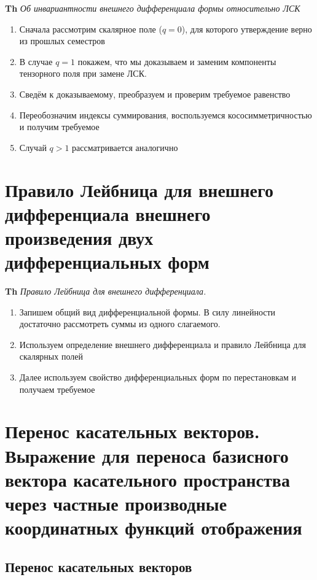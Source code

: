 \documentclass[a4paper, 14pt]{article}
\begin{document}
    \textbf{Th} \textit{Об инвариантности внешнего дифференциала формы относительно ЛСК}
    
    \begin{enumerate}
        \item Сначала рассмотрим скалярное поле ($q = 0$), для которого утверждение верно из прошлых семестров
        \item В случае $q = 1$ покажем, что мы доказываем и заменим компоненты тензорного поля при замене ЛСК.
        \item Сведём к доказываемому, преобразуем и проверим требуемое равенство
        \item Переобозначим индексы суммирования, воспользуемся кососимметричностью и получим требуемое
        \item Случай $q > 1$ рассматривается аналогично
    \end{enumerate}
    
    \section{Правило Лейбница для внешнего дифференциала внешнего произведения двух дифференциальных форм}
    
    \textbf{Th} \textit{Правило Лейбница для внешнего дифференциала.}
    
    \begin{enumerate}
        \item Запишем общий вид дифференциальной формы.
        В силу линейности достаточно рассмотреть суммы из одного слагаемого.
        \item Используем определение внешнего дифференциала и правило Лейбница для скалярных полей
        \item Далее используем свойство дифференциальных форм по перестановкам и получаем требуемое
    \end{enumerate}
    
    \section{Перенос касательных векторов.
    Выражение для переноса базисного вектора касательного пространства через частные производные координатных функций
    отображения}
    
    \subsection{Перенос касательных векторов}
    
\end{document}
